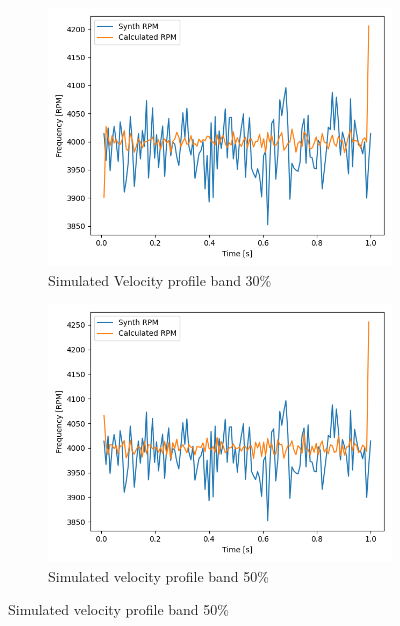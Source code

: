 \documentclass[10pt,fleqn,a4paper,twoside]{article}
\begin{document}
\newpage
\begin{figure}[H] 
    \centering
    \begin{subfigure}{0.4\textwidth}
        \includegraphics[width=\textwidth]{Figures/rpm_analysis_band_30.png}
        \caption{Simulated Velocity profile band 30\%}
        \label{fig:second}
    \end{subfigure}
    \hfill
    \centering
    \begin{subfigure}{0.4\textwidth}
        \includegraphics[width=\textwidth]{Figures/rpm_analysis_band_50.png}
        \caption{Simulated velocity profile band 50\%}
        \label{fig:third}
    \end{subfigure}
    \centering
    \hfill
    

\end{figure}
\end{document}
